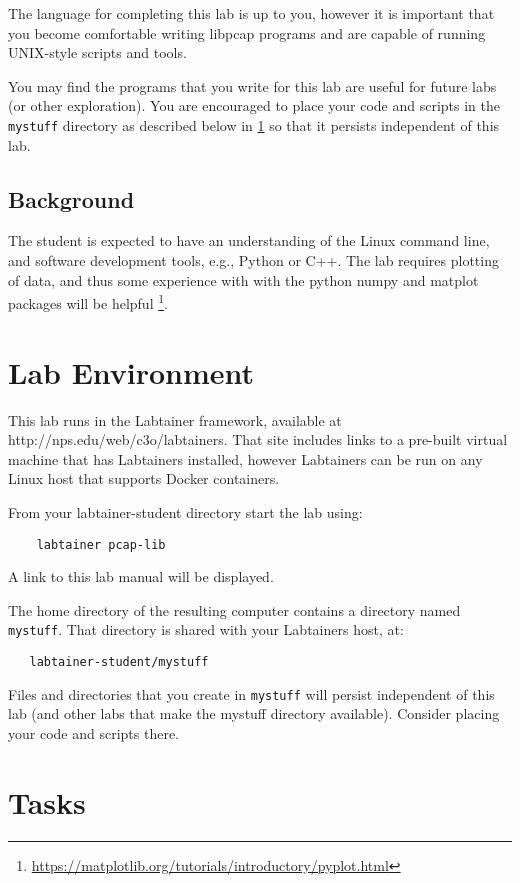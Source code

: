 The language for completing this lab is up to you, however it is important that you become comfortable writing libpcap programs and are capable of running UNIX-style scripts and tools. 

You may find the programs that you write for this lab are useful for future labs (or other exploration).  You are encouraged to place your code and scripts
in the {\tt mystuff} directory as described below in \ref{environment} so that it persists independent of this lab.

\subsection {Background}
The student is expected to have an understanding of the Linux command line, and software development tools, e.g., Python or C++.
The lab requires plotting of data, and thus some experience with with the python numpy and matplot packages will be helpful \footnote{\url{https://matplotlib.org/tutorials/introductory/pyplot.html}}.

\section{Lab Environment}
\label{environment}
This lab runs in the Labtainer framework,
available at http://nps.edu/web/c3o/labtainers.
That site includes links to a pre-built virtual machine
that has Labtainers installed, however Labtainers can
be run on any Linux host that supports Docker containers.

From your labtainer-student directory start the lab using:
\begin{verbatim}
    labtainer pcap-lib
\end{verbatim}
\noindent A link to this lab manual will be displayed.  

The home directory of the resulting computer contains a directory named {\tt mystuff}.  That directory is shared with your Labtainers host,
at:
\begin{verbatim}
   labtainer-student/mystuff
\end{verbatim}
\noindent Files and directories that you create in {\tt mystuff} will persist independent of this lab (and other labs that make the mystuff
directory available).  Consider placing your code and scripts there.

\section{Tasks}
